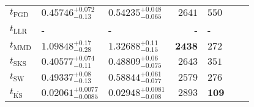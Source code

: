 \begin{tabular}{l|llr|llr}
	\midrule
	$t_{\mathrm{FGD}}$ & $0.45746_{-0.13}^{+0.072}$ & $0.54235_{-0.065}^{+0.048}$ & $2641$ & $550$ \\
	$t_{\mathrm{LLR}}$ & - & - & - & - \\
	$t_{\mathrm{MMD}}$ & $1.09848_{-0.28}^{+0.17}$ & $1.32688_{-0.15}^{+0.11}$ & ${\mathbf{2438}}$ & $272$ \\
	$t_{\mathrm{SKS}}$ & $0.40577_{-0.11}^{+0.074}$ & $0.48809_{-0.075}^{+0.06}$ & $2643$ & $351$ \\
	$t_{\mathrm{SW}}$ & $0.49337_{-0.13}^{+0.08}$ & $0.58844_{-0.077}^{+0.061}$ & $2579$ & $276$ \\
	$t_{\overline{\mathrm{KS}}}$ & ${\mathbf{0.02061_{-0.0085}^{+0.0077}}}$ & ${\mathbf{0.02948_{-0.008}^{+0.0081}}}$ & $2893$ & ${\mathbf{109}}$ \\
	\bottomrule
\end{tabular}